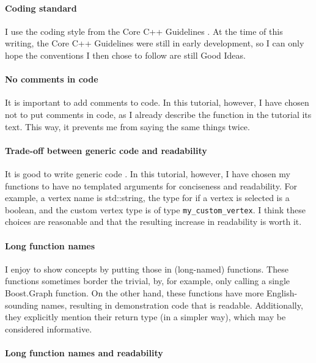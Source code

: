 \paragraph{Coding standard}

I use the coding style from the Core C++ Guidelines .
At the time of this writing, the Core C++ Guidelines were still in early
development, so I can only hope the conventions I then chose to follow
are still Good Ideas.

\paragraph{No comments in code}

It is important to add comments to code.
In this tutorial, however, I have chosen not to put comments in code, 
as I already describe the function in the tutorial its text.
This way, it prevents me from saying the same things twice.

\paragraph{Trade-off between generic code and readability}

It is good to write generic code .
In this tutorial, however, I have chosen my functions to have 
no templated arguments  for conciseness and readability.
For example, a vertex name is std::string, 
the type for if a vertex is selected is a boolean, 
and the custom vertex type is of type \verb;my_custom_vertex;.
I think these choices are reasonable and that the resulting increase in
readability is worth it.

\paragraph{Long function names}

I enjoy to show concepts by putting those in (long-named) functions.
These functions sometimes border the trivial, by, for example, only calling
a single Boost.Graph function.
On the other hand, these functions have more English-sounding names, resulting
in demonstration code that is readable.
Additionally, they explicitly mention their return type (in a simpler way),
which may be considered informative.

\paragraph{Long function names and readability}

